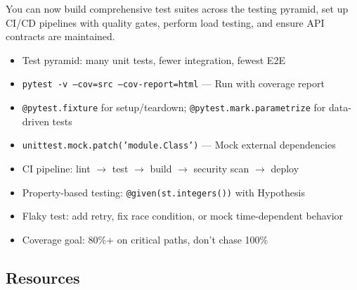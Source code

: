\documentclass[11pt, a4paper, oneside]{report}
\begin{document}
\begin{microcheckpoint}
You can now build comprehensive test suites across the testing pyramid, set up CI/CD pipelines with quality gates, perform load testing, and ensure API contracts are maintained.
\end{microcheckpoint}

\begin{cheatsheetbox}
\begin{itemize}[leftmargin=*]
\item Test pyramid: many unit tests, fewer integration, fewest E2E
\item \texttt{pytest -v --cov=src --cov-report=html} --- Run with coverage report
\item \texttt{@pytest.fixture} for setup/teardown; \texttt{@pytest.mark.parametrize} for data-driven tests
\item \texttt{unittest.mock.patch('module.Class')} --- Mock external dependencies
\item CI pipeline: lint $\to$ test $\to$ build $\to$ security scan $\to$ deploy
\item Property-based testing: \texttt{@given(st.integers())} with Hypothesis
\item Flaky test: add retry, fix race condition, or mock time-dependent behavior
\item Coverage goal: 80\%+ on critical paths, don't chase 100\%
\end{itemize}
\end{cheatsheetbox}

\subsection*{Resources}
\end{document}
